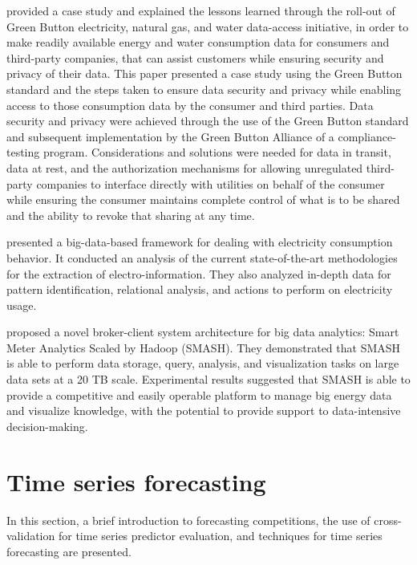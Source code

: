 \cite{Nguyen2019} provided a case study and explained the lessons learned through the roll-out of Green Button electricity, natural gas, and water data-access initiative, in order to make readily available energy and water consumption data for consumers and third-party companies, that can assist customers while ensuring security and privacy of their data.
This paper presented a case study using the Green Button standard and the steps taken to ensure data security and privacy while enabling access to those consumption data by the consumer and third parties.
Data security and privacy were achieved through the use of the Green Button standard and subsequent implementation by the Green Button Alliance of a compliance-testing program.
Considerations and solutions were needed for data in transit, data at rest, and the authorization mechanisms for allowing unregulated third-party companies to interface directly with utilities on behalf of the consumer while ensuring the consumer maintains complete control of what is to be shared and the ability to revoke that sharing at any time.

\cite{8577770} presented a big-data-based framework for dealing with electricity consumption behavior.
It conducted an analysis of the current state-of-the-art methodologies for the extraction of electro-information.
They also analyzed in-depth data for pattern identification, relational analysis, and actions to perform on electricity usage.

\cite{WILCOX2019250} proposed a novel broker-client system architecture for big data analytics: Smart Meter Analytics Scaled by Hadoop (SMASH).
They demonstrated that SMASH is able to perform data storage, query, analysis, and visualization tasks on large data sets at a 20 TB scale.
Experimental results suggested that SMASH is able to provide a competitive and easily operable platform to manage big energy data and visualize knowledge, with the potential to provide support to data-intensive decision-making.


\section{Time series forecasting}
\label{sec:timeseries}
\vspace{0.2 cm}

In this section, a brief introduction to forecasting competitions, the use of cross-validation for time series predictor evaluation, and techniques for time series forecasting are presented.

